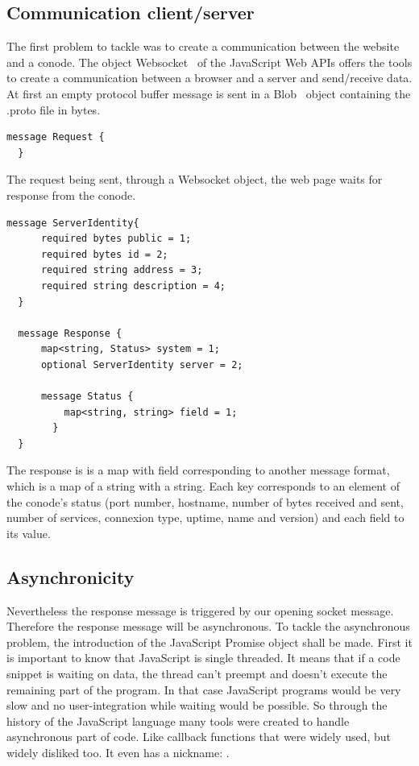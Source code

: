 \documentclass[11pt, a4paper, twoside, openright, openany]{article}
\begin{document}
\subsection{Communication client/server}
The first problem to tackle was to create a communication between the website
and a conode.
\newline
The object Websocket~\cite{websocketPage} of the JavaScript Web APIs offers the tools to create a communication
between a browser and a server and send/receive data.
\newline
At first an empty protocol buffer message is sent in a Blob~\cite{blob} object containing
the .proto file in bytes.
\bigbreak

\begin{lstlisting}[caption={Empty protocol buffer message}, captionpos=b]
  message Request {
  }
\end{lstlisting}

The request being sent, through a Websocket object, the web page waits for response from the conode.
\bigbreak

\begin{lstlisting}[caption={Response protocol buffer messages}, captionpos=b]
  message ServerIdentity{
      required bytes public = 1;
      required bytes id = 2;
      required string address = 3;
      required string description = 4;
  }

  message Response {
      map<string, Status> system = 1;
      optional ServerIdentity server = 2;

      message Status {
          map<string, string> field = 1;
    	}
  }
\end{lstlisting}

The response is is a map with field corresponding to another message format, which
is a map of a string with a string. Each key corresponds to an element of the conode's
status (port number, hostname, number of bytes received and sent, number of services,
 connexion type, uptime, name and version) and each field to its value.
\bigbreak

\subsection{Asynchronicity}

Nevertheless the response message is triggered by our opening socket message.
Therefore the response message will be asynchronous.
\newline
To tackle the asynchronous problem, the introduction of the JavaScript Promise object shall be made.
\newline
First it is important to know that JavaScript is single threaded.
It means that if a code snippet is waiting on data, the thread can't preempt
and doesn't execute the remaining part of the program. In that case JavaScript programs
would be very slow and no user-integration while waiting would be possible.
So through the history of the JavaScript language many tools were
created to handle asynchronous part of code. Like callback functions that were widely
used, but widely disliked too. It even has a nickname: .
\bigbreak
\end{document}
